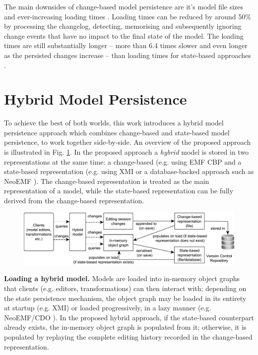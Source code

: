 The main downsides of change-based model persistence are it's model file sizes \cite{DBLP:journals/entcs/RobbesL07,DBLP:conf/edoc/KoegelHLHD10} and ever-increasing loading times \cite{mens2002state}. Loading times can be reduced by around 50\% by processing the changelog, detecting, memorising and subsequently ignoring change events that have no impact to the final state of the model. The loading times are still substantially longer -- more than 6.4 times slower and even longer as the persisted changes increase -- than loading times for state-based approaches \cite{yohannis2018towards}. 

\section{Hybrid Model Persistence}
\label{sec:hybrid_model_persistence}
To achieve the best of both worlds, this work introduces a hybrid model persistence approach which combines change-based and state-based model persistence, to work together side-by-side. An overview of the proposed approach is illustrated in Fig. \ref{fig:hybrid_persistence}. In the proposed approach a \textit{hybrid} model is stored in two representations at the same time: a change-based (e.g. using EMF CBP \cite{epsilonlabs2019emfcbp} and a state-based representation (e.g. using XMI \cite{omg2018xmi} or a database-backed approach such as NeoEMF \cite{daniel2016neoemf}). The change-based representation is treated as the main representation of a model, while the state-based representation can be fully derived from the change-based representation.

\begin{figure}[t]
  \includegraphics[width=\linewidth]{images/hybrid_persistence}
  \label{fig:hybrid_persistence}
\end{figure}

\textbf{Loading a hybrid model.} Models are loaded into in-memory object graphs that clients (e.g. editors, transformations) can then interact with; depending on the state persistence mechanism, the object graph may be loaded in its entirety at startup (e.g. XMI) or loaded progressively, in a lazy manner (e.g. NeoEMF/CDO \cite{daniel2016neoemf,eclipse2019cdo}). In the proposed hybrid approach, if the state-based counterpart already exists, the in-memory object graph is populated from it; otherwise, it is populated by replaying the complete editing history recorded in the change-based representation.

